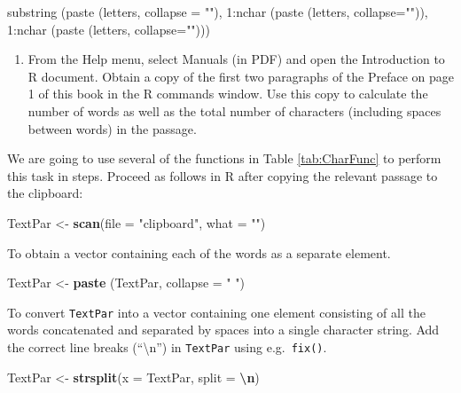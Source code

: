 \documentclass[
]{book}
\newenvironment{Shaded}{\begin{snugshade}}{\end{snugshade}}
\newcommand{\AttributeTok}[1]{\textcolor[rgb]{0.13,0.29,0.53}{#1}}
\newcommand{\FunctionTok}[1]{\textcolor[rgb]{0.13,0.29,0.53}{\textbf{#1}}}
\newcommand{\NormalTok}[1]{#1}
\newcommand{\OtherTok}[1]{\textcolor[rgb]{0.56,0.35,0.01}{#1}}
\newcommand{\SpecialCharTok}[1]{\textcolor[rgb]{0.81,0.36,0.00}{\textbf{#1}}}
\newcommand{\StringTok}[1]{\textcolor[rgb]{0.31,0.60,0.02}{#1}}
\providecommand{\tightlist}{%
  \setlength{\itemsep}{0pt}\setlength{\parskip}{0pt}}
\begin{document}
\begin{Shaded}
\begin{Highlighting}[]
\NormalTok{substring (paste (letters, collapse = ""),  }
\NormalTok{             1:nchar (paste (letters, collapse="")), }
\NormalTok{             1:nchar (paste (letters, collapse="")))}
\end{Highlighting}
\end{Shaded}

\begin{enumerate}
\def\labelenumi{(\alph{enumi})}
\setcounter{enumi}{6}
\tightlist
\item
  From the Help menu, select Manuals (in PDF) and open the Introduction to R document. Obtain a copy of the first two paragraphs of the Preface on page 1 of this book in the R commands window. Use this copy to calculate the number of words as well as the total number of characters (including spaces between words) in the passage.
\end{enumerate}

We are going to use several of the functions in Table \ref{tab:CharFunc} to perform this task in steps. Proceed as follows in R after copying the relevant passage to the clipboard:

\begin{Shaded}
\begin{Highlighting}[]
\NormalTok{TextPar }\OtherTok{\textless{}{-}} \FunctionTok{scan}\NormalTok{(}\AttributeTok{file =} \StringTok{"clipboard"}\NormalTok{, }\AttributeTok{what =} \StringTok{""}\NormalTok{)}
\end{Highlighting}
\end{Shaded}

To obtain a vector containing each of the words as a separate element.

\begin{Shaded}
\begin{Highlighting}[]
\NormalTok{TextPar }\OtherTok{\textless{}{-}} \FunctionTok{paste}\NormalTok{ (TextPar, }\AttributeTok{collapse =} \StringTok{" "}\NormalTok{)}
\end{Highlighting}
\end{Shaded}

To convert \texttt{TextPar} into a vector containing one element consisting of all the words concatenated and separated by spaces into a single character string. Add the correct line breaks (``\textbackslash n'') in \texttt{TextPar} using e.g.~\texttt{fix()}.

\begin{Shaded}
\begin{Highlighting}[]
\NormalTok{TextPar }\OtherTok{\textless{}{-}} \FunctionTok{strsplit}\NormalTok{(}\AttributeTok{x =}\NormalTok{ TextPar, }\AttributeTok{split =} \StringTok{\textquotesingle{}}\SpecialCharTok{\textbackslash{}n}\StringTok{\textquotesingle{}}\NormalTok{)}
\end{Highlighting}
\end{Shaded}
\end{document}
